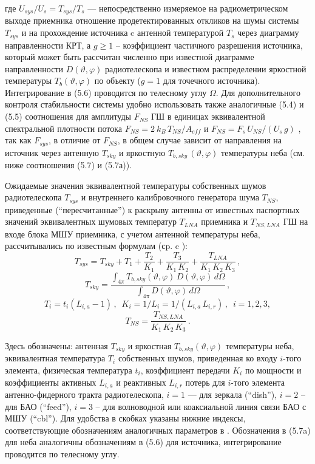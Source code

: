 \noindent
где $ U_{sys} / U_s = T_{sys} / T_s$ --- непосредственно измеряемое на
радиометрическом выходе приемника отношение продетектированных
откликов на шумы системы $T_{sys}$ и на прохождение источника c
антенной температурой $T_s$ через диаграмму направленности КРТ,
а $g \ge 1$ -- коэффициент частичного разрешения источника,
который может быть рассчитан численно при известной диаграмме
направленности $D(\vartheta, \varphi)$ радиотелескопа и
известном распределении яркостной температуры
$T_b (\vartheta, \varphi)$
по объекту ($g = 1$ для точечного источника).
Интегрирование в (5.6) проводится по телесному углу $\Omega$.
Для дополнительного контроля
стабильности системы удобно использовать также
аналогичные (5.4) и (5.5) соотношения для амплитуды $F_{NS}$
ГШ в единицах эквивалентной спектральной плотности потока
$F_{NS} = 2\ k_B\, T_{NS} / A_{eff}$ и
$F_{NS} = F_s\, U_{NS} / (U_s\, g)$  \cite{Kovalev_1999},
так как $F_{sys}$, в отличие от $F_{NS}$, в общем случае зависит от
направления на источник через антенную $T_{sky}$ и яркостную
$T_{b,sky}\, (\vartheta, \varphi)$ температуры неба (см. ниже
соотношения (5.7) и (5.7а)).

Ожидаемые значения эквивалентной температуры собственных шумов радиотелескопа
$T_{sys}$ и внутреннего калибровочного генератора шума $T_{NS}$,
приведенные (``пересчитанные'') к раскрыву антенны от известных паспортных
значений эквивалентных шумовых температур $T_{LNA}$ приемника и $T_{NS,LNA}$ ГШ
на входе блока МШУ приемника, с учетом антенной температуры
неба, рассчитывались по известным формулам (сp. c \cite{RAUH}):
$$
T_{sys} = T_{sky} + T_1 + \frac{T_2}{K_1} +
\frac{T_3}{K_1\, K_2} + \frac{T_{LNA}}{K_1\, K_2\, K_3}\,,
$$
$$
T_{sky} = \frac{\int_{4 \pi}^{}{T_{b,sky} (\vartheta, \varphi)\, D(\vartheta, \varphi)\, d\Omega}}
{\int_{4 \pi}^{}{D(\vartheta, \varphi)\, d \Omega}} \,,
$$
$$
T_i = t_i (L_{i,a} -1)\, , \,\,\,
K_i = 1/ L_i = 1 / (L_{i,a}\, L_{i,r})\, , \,\,\, i = 1, 2, 3,
$$
$$
T_{NS} = \frac{T_{NS,LNA}}{K_1\, K_2\, K_3}\,.
$$

\noindent
Здесь обозначены: антенная $T_{sky}$ и яркостная  $T_{b,sky} (\vartheta, \varphi)$
температуры неба, эквивалентная температура $T_i$ собственных шумов,
приведенная ко входу $i$-того элемента,
физическая температура $t_i$, коэффициент передачи $K_i$ по мощности
и коэффициенты активных $L_{i,a}$ и реактивных $L_{i,r}$ потерь
для $i$-того элемента антенно-фидерного тракта радиотелескопа,
$i = 1$ --- для зеркала (``dish''), $i = 2$ -- для БАО (``feed''),
$i = 3$ -- для волноводной или коаксиальной линия связи БАО с МШУ (``cbl'').
Для удобства в скобках указаны нижние индексы, соответствующие обозначениям
аналогичных параметров в \cite{RAUH}.
Обозначения в (5.7a) для неба аналогичны обозначениям в (5.6) для источника,
интегрирование проводится по телесному углу.

